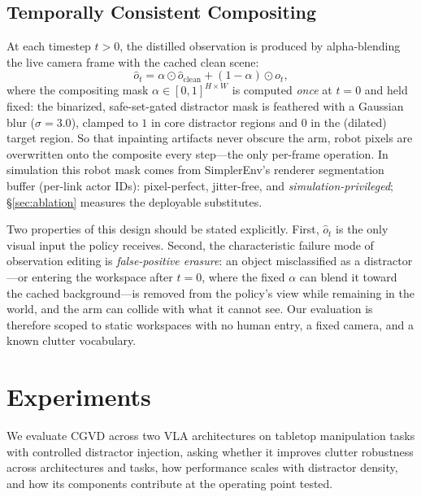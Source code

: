 \documentclass[letterpaper, 10 pt, conference]{ieeeconf}  %
\begin{document}

\subsection{Temporally Consistent Compositing}
\label{sec:compositing}
At each timestep $t > 0$, the distilled observation is produced by alpha-blending the live camera frame with the cached clean scene:
\begin{equation}
    \hat{o}_t = \alpha \odot \hat{o}_{\text{clean}} + (1 - \alpha) \odot o_t,
    \label{eq:compositing}
\end{equation}
where the compositing mask $\alpha \in [0,1]^{H \times W}$ is computed \emph{once} at $t{=}0$ and held fixed: the binarized, safe-set-gated distractor mask is feathered with a Gaussian blur ($\sigma = 3.0$), clamped to $1$ in core distractor regions and $0$ in the (dilated) target region. So that inpainting artifacts never obscure the arm, robot pixels are overwritten onto the composite every step---the only per-frame operation. In simulation this robot mask comes from SimplerEnv's renderer segmentation buffer (per-link actor IDs): pixel-perfect, jitter-free, and \emph{simulation-privileged}; \S\ref{sec:ablation} measures the deployable substitutes.

Two properties of this design should be stated explicitly. First, $\hat{o}_t$ is the only visual input the policy receives. Second, the characteristic failure mode of observation editing is \emph{false-positive erasure}: an object misclassified as a distractor---or entering the workspace after $t{=}0$, where the fixed $\alpha$ can blend it toward the cached background---is removed from the policy's view while remaining in the world, and the arm can collide with what it cannot see. Our evaluation is therefore scoped to static workspaces with no human entry, a fixed camera, and a known clutter vocabulary.


\section{Experiments}
\label{sec:experiments}
We evaluate CGVD across two VLA architectures on tabletop manipulation tasks with controlled distractor injection, asking whether it improves clutter robustness across architectures and tasks, how performance scales with distractor density, and how its components contribute at the operating point tested.


\end{document}
